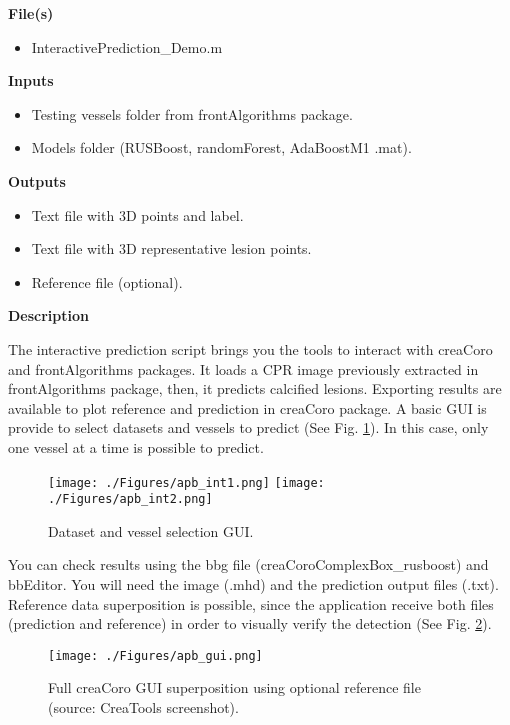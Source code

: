 \textbf{File(s)}
\begin{itemize}
\item InteractivePrediction\_Demo.m
\end{itemize}

\textbf{Inputs}
\begin{itemize}
\item Testing vessels folder from frontAlgorithms package.
\item Models folder (RUSBoost, randomForest, AdaBoostM1 .mat).
\end{itemize}

\textbf{Outputs}
\begin{itemize}
\item Text file with 3D points and label.
\item Text file with 3D representative lesion points.
\item Reference file (optional).
\end{itemize}

\textbf{Description}

The interactive prediction script brings you the tools to interact with creaCoro and frontAlgorithms packages. It loads a CPR image previously extracted in frontAlgorithms package, then, it predicts calcified lesions. Exporting results are available to plot reference and prediction in creaCoro package. A basic GUI is provide to select datasets and vessels to predict (See Fig. \ref{fig:int1}). In this case, only one vessel at a time is possible to predict.

\begin{figure}[ht]
	\centering
		\texttt{[image: ./Figures/apb\_int1.png]}
		\texttt{[image: ./Figures/apb\_int2.png]}
	\caption[Dataset Selection GUI]{Dataset and vessel selection GUI.}
	\label{fig:int1}
\end{figure}

You can check results using the bbg file (creaCoroComplexBox\_rusboost) and bbEditor. You will need the image (.mhd) and the prediction output files (.txt). Reference data superposition is possible, since the application receive both files (prediction and reference) in order to visually verify the detection (See Fig. \ref{fig:apb_gui}).

\begin{figure}[ht]
	\centering
		\texttt{[image: ./Figures/apb\_gui.png]}
	\caption[Lesion Visualization GUI]{Full creaCoro GUI superposition using optional reference file (source: CreaTools screenshot).}
	\label{fig:apb_gui}
\end{figure}